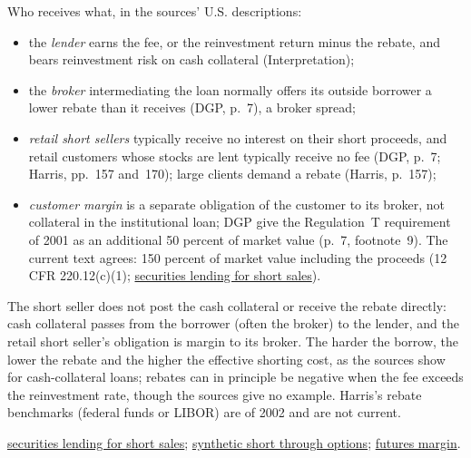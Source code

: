 \begin{qfdefinition}
 Who receives what, in the sources' U.S. descriptions:
\begin{itemize}
\item the \emph{lender} earns the fee, or the reinvestment return minus the rebate, and bears reinvestment risk on cash collateral (Interpretation);
\item the \emph{broker} intermediating the loan normally offers its outside borrower a lower rebate than it receives (DGP, p.~7), a broker spread;
\item \emph{retail short sellers} typically receive no interest on their short proceeds, and retail customers whose stocks are lent typically receive no fee (DGP, p.~7; Harris, pp.~157 and~170); large clients demand a rebate (Harris, p.~157);
\item \emph{customer margin} is a separate obligation of the customer to its broker, not collateral in the institutional loan; DGP give the Regulation~T requirement of 2001 as an additional 50 percent of market value (p.~7, footnote~9). The current text agrees: 150 percent of market value including the proceeds (12 CFR 220.12(c)(1); \hyperref[mech:securities-lending-short-sale]{securities lending for short sales}).
\end{itemize}

 The short seller does not post the cash collateral or receive the rebate directly: cash collateral passes from the borrower (often the broker) to the lender, and the retail short seller's obligation is margin to its broker. The harder the borrow, the lower the rebate and the higher the effective shorting cost, as the sources show for cash-collateral loans; rebates can in principle be negative when the fee exceeds the reinvestment rate, though the sources give no example. Harris's rebate benchmarks (federal funds or LIBOR) are of 2002 and are not current.

 \hyperref[mech:securities-lending-short-sale]{securities lending for short sales}; \hyperref[res:synthetic-short-put-call]{synthetic short through options}; \hyperref[mech:futures-margin-settlement]{futures margin}.

\end{qfdefinition}
